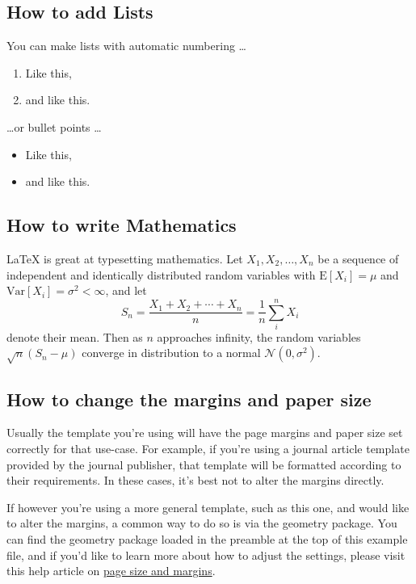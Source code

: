 \documentclass[twocolumn, 9pt]{extarticle}
\begin{document}
\subsection{How to add Lists}

You can make lists with automatic numbering \dots

\begin{enumerate}
\item Like this,
\item and like this.
\end{enumerate}
\dots or bullet points \dots
\begin{itemize}
\item Like this,
\item and like this.
\end{itemize}

\subsection{How to write Mathematics}

\LaTeX{} is great at typesetting mathematics. Let $X_1, X_2, \ldots, X_n$ be a sequence of independent and identically distributed random variables with $\text{E}[X_i] = \mu$ and $\text{Var}[X_i] = \sigma^2 < \infty$, and let
\[S_n = \frac{X_1 + X_2 + \cdots + X_n}{n}
      = \frac{1}{n}\sum_{i}^{n} X_i\]
denote their mean. Then as $n$ approaches infinity, the random variables $\sqrt{n}(S_n - \mu)$ converge in distribution to a normal $\mathcal{N}(0, \sigma^2)$.


\subsection{How to change the margins and paper size}

Usually the template you're using will have the page margins and paper size set correctly for that use-case. For example, if you're using a journal article template provided by the journal publisher, that template will be formatted according to their requirements. In these cases, it's best not to alter the margins directly.

If however you're using a more general template, such as this one, and would like to alter the margins, a common way to do so is via the geometry package. You can find the geometry package loaded in the preamble at the top of this example file, and if you'd like to learn more about how to adjust the settings, please visit this help article on \href{https://www.overleaf.com/learn/latex/page_size_and_margins}{page size and margins}.
\end{document}
